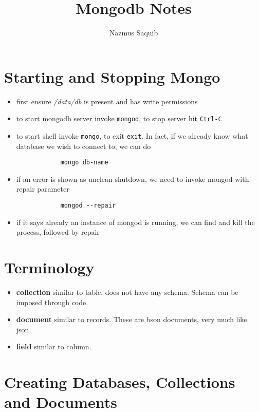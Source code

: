 \documentclass[a4paper, 12pt]{article}
\begin{document}
\title{Mongodb Notes}
\author{Nazmus Saquib}

\maketitle
\tableofcontents

\section{Starting and Stopping Mongo}
\begin{itemize}
    \item first ensure \emph{/data/db} is present and has write permissions
    \item to start mongodb server invoke \verb|mongod|, to stop server hit \verb|Ctrl-C|
    \item to start shell invoke \verb|mongo|, to exit \verb|exit|. In fact, if we already know what database we wish to connect to, we can do
		\begin{verbatim}
			mongo db-name
		\end{verbatim}
    \item if an error is shown as unclean shutdown, we need to invoke mongod with repair parameter
        \begin{verbatim}
            mongod --repair
        \end{verbatim}
    \item if it says already an instance of mongod is running, we can find and kill the process, followed by repair
\end{itemize}

\section{Terminology}
\begin{itemize}
    \item \textbf{collection} similar to table, does not have any schema. Schema can be imposed through code.
    \item \textbf{document} similar to records. These are bson documents, very much like json.
    \item \textbf{field} similar to column.
\end{itemize}

\section{Creating Databases, Collections and Documents}
\end{document}
